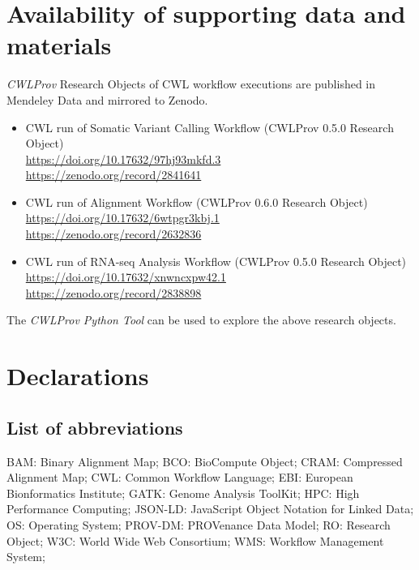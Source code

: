 \documentclass[a4paper,num-refs]{oup-contemporary}
\begin{document}
\section{Availability of supporting data and materials}

\textit{CWLProv} Research Objects of CWL workflow executions are published in Mendeley Data and mirrored to Zenodo.

\begin{itemize}
    \item \begin{sloppypar}
    CWL run of Somatic Variant Calling Workflow (CWLProv 0.5.0 Research Object) 
      \citep{somatic_mendeley}  \\
      \url{https://doi.org/10.17632/97hj93mkfd.3} \\
      \url{https://zenodo.org/record/2841641}
    \end{sloppypar}
    \item \begin{sloppypar}
    CWL run of Alignment Workflow (CWLProv 0.6.0 Research Object)
      \citep{alignment_mendeley} \\
      \url{https://doi.org/10.17632/6wtpgr3kbj.1} \\
      \url{https://zenodo.org/record/2632836}
    \end{sloppypar}
    \item \begin{sloppypar}
        CWL run of RNA-seq Analysis Workflow (CWLProv 0.5.0 Research Object)
        \citep{rnaseq_mendeley} \\
        \url{https://doi.org/10.17632/xnwncxpw42.1} \\
        \url{https://zenodo.org/record/2838898}
    \end{sloppypar}
\end{itemize}


The \textit{CWLProv Python Tool} can be used to explore the above research objects.

\section{Declarations}

\subsection{List of abbreviations}
BAM: Binary Alignment Map; BCO: BioCompute Object; CRAM: Compressed Alignment Map; CWL: Common Workflow Language; EBI: European Bionformatics Institute; GATK: Genome Analysis ToolKit; HPC: High Performance Computing; JSON-LD: JavaScript Object Notation for Linked Data; OS: Operating System; PROV-DM: PROVenance Data Model; RO: Research Object; W3C: World Wide Web Consortium; WMS: Workflow Management System;     
\end{document}
